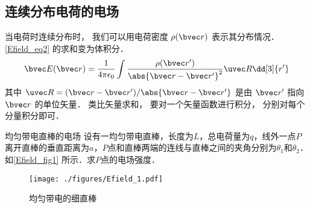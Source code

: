 \subsection{连续分布电荷的电场}
当电荷时连续分布时， 我们可以用电荷密度 $\rho(\bvec r)$ 表示其分布情况． \autoref{Efield_eq2} 的求和变为体积分．
\begin{equation}
\bvec E(\bvec r) = \frac{1}{4\pi\epsilon_0} \int \frac{\rho(\bvec r')}{\abs{\bvec r - \bvec r'}^2} \uvec R \dd[3]{r'}
\end{equation}
其中 $\uvec R = (\bvec r - \bvec r') / \abs{\bvec r - \bvec r'}$ 是由 $\bvec r'$ 指向 $\bvec r$ 的单位矢量． 类比矢量求和， 要对一个矢量函数进行积分， 分别对每个分量积分即可．

\begin{example}{均匀带电直棒的电场}\label{Efield_ex1}
设有一均匀带电直棒，长度为$L$，总电荷量为$q$，线外一点$P$离开直棒的垂直距离为$a$，$P$点和直棒两端的连线与直棒之间的夹角分别为$\theta_1$和$\theta_2$．如\autoref{Efield_fig1} 所示．求$P$点的电场强度．
\begin{figure}[ht]
\centering
\texttt{[image: ./figures/Efield\_1.pdf]}
\caption{均匀带电的细直棒} \label{Efield_fig1}
\end{figure}


\end{example}
